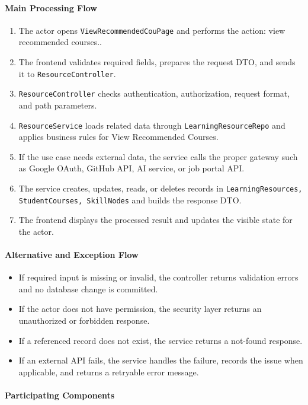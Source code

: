 \paragraph{Main Processing Flow}

\begin{enumerate}
    \item The actor opens \texttt{ViewRecommendedCouPage} and performs the action: view recommended courses..
    \item The frontend validates required fields, prepares the request DTO, and sends it to \texttt{ResourceController}.
    \item \texttt{ResourceController} checks authentication, authorization, request format, and path parameters.
    \item \texttt{ResourceService} loads related data through \texttt{LearningResourceRepo} and applies business rules for View Recommended Courses.
    \item If the use case needs external data, the service calls the proper gateway such as Google OAuth, GitHub API, AI service, or job portal API.
    \item The service creates, updates, reads, or deletes records in \texttt{LearningResources, StudentCourses, SkillNodes} and builds the response DTO.
    \item The frontend displays the processed result and updates the visible state for the actor.
\end{enumerate}

\paragraph{Alternative and Exception Flow}

\begin{itemize}
    \item If required input is missing or invalid, the controller returns validation errors and no database change is committed.
    \item If the actor does not have permission, the security layer returns an unauthorized or forbidden response.
    \item If a referenced record does not exist, the service returns a not-found response.
    \item If an external API fails, the service handles the failure, records the issue when applicable, and returns a retryable error message.
\end{itemize}

\paragraph{Participating Components}

